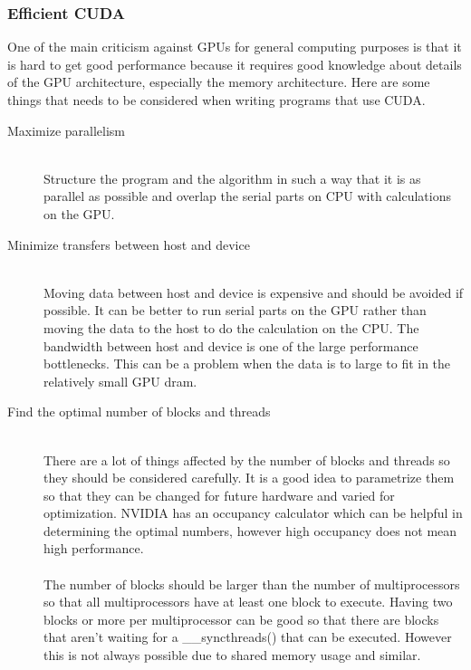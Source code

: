 \documentclass[10pt,a4paper]{report}
\begin{document}

\subsubsection{Efficient CUDA}
One of the main criticism against GPUs for general computing purposes is that it is hard to get good performance because it requires good knowledge about details of the GPU architecture, especially the memory architecture. Here are some things that needs to be considered when writing programs that use CUDA.\cite{plink_gpu, cuda, cuda_best_practice}
\\
\begin{description}
  \item[Maximize parallelism] \hfill \\
  Structure the program and the algorithm in such a way that it is as parallel as possible and overlap the serial parts on CPU with calculations on the GPU.\cite{plink_gpu, cuda}
  \item[Minimize transfers between host and device] \hfill \\
  Moving data between host and device is expensive and should be avoided if possible. It can be better to run serial parts on the GPU rather than moving the data to the host to do the calculation on the CPU. The bandwidth between host and device is one of the large performance bottlenecks. This can be a problem when the data is to large to fit in the relatively small GPU dram.\cite{cuda, cuda_best_practice}
  \item[Find the optimal number of blocks and threads] \hfill \\
  There are a lot of things affected by the number of blocks and threads so they should be considered carefully. It is a good idea to parametrize them so that they can be changed for future hardware and varied for optimization. NVIDIA has an occupancy calculator which can be helpful in determining the optimal numbers, however high occupancy does not mean high performance.\cite{cuda, cuda_best_practice}\\
  \\
  The number of blocks should be larger than the number of multiprocessors so that all multiprocessors have at least one block to execute. Having two blocks or more per multiprocessor can be good so that there are blocks that aren't waiting for a \_\_syncthreads() that can be executed. However this is not always possible due to shared memory usage and similar.\cite{cuda_best_practice}\\

\end{description}
\end{document}
